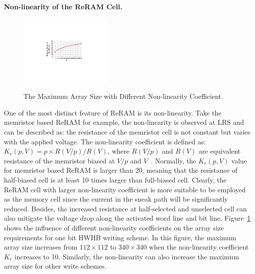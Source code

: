 \vspace{6pt} \textbf{Non-linearity of the ReRAM Cell.} \vspace{6pt}

\begin{figure}[!b]
\centering
  \includegraphics[width=0.4\textwidth]{./figures/non_linear}\\
  \caption{The Maximum Array Size with Different Non-linearity Coefficient.}\label{fig:non_linear}
\end{figure}
One of the most distinct feature of ReRAM is its non-linearity. Take the memristor based ReRAM for example, the non-linearity is observed at LRS and can be described as: the resistance of the memristor cell is not constant but varies with the applied voltage. The non-linearity coefficient is defined as:
$K_r(p,V) = p \times R(V/p)/R(V)$, where $R(V/p)$ and $R(V)$ are equivalent resistance of the memristor biased at $V/p$ and $V$~\cite{memristor:Cong}. Normally, the $K_r(p,V)$ value for memristor based ReRAM is larger than 20, meaning that the resistance of half-biased  cell is at least 10 times larger than full-biased cell. Clearly, the ReRAM cell with larger non-linearity coefficient is more suitable to be employed as the memory cell since the current in the sneak path will be significantly reduced. Besides, the increased resistance at half-selected and unselected cell can also mitigate the voltage drop along the activated word line and bit line. Figure~\ref{fig:non_linear} shows the influence of different non-linearity coefficients on the array size requirements for one bit HWHB writing scheme. In this figure, the maximum array size increases from $112 \times 112$ to $340 \times 340$ when the non-linearity coefficient $K_r$ increases to 10. Similarly, the non-linearity can also increase the maximum array size for other write schemes.


